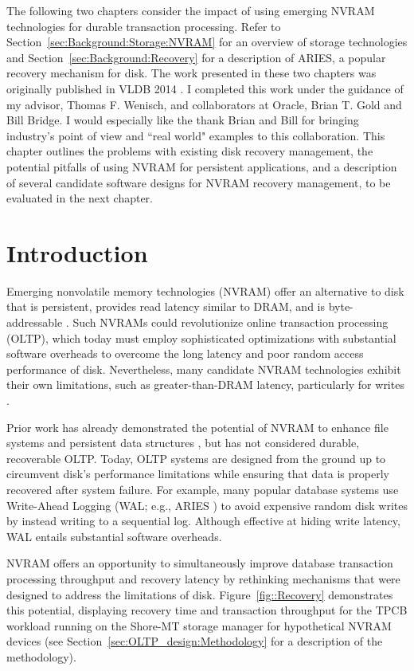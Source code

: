 The following two chapters consider the impact of using emerging NVRAM technologies for durable transaction processing.
Refer to Section~\ref{sec:Background:Storage:NVRAM} for an overview of storage technologies and Section~\ref{sec:Background:Recovery} for a description of ARIES, a popular recovery mechanism for disk.
The work presented in these two chapters was originally published in VLDB 2014 \cite{Pelley13}.
I completed this work under the guidance of my advisor, Thomas F. Wenisch, and collaborators at Oracle, Brian T. Gold and Bill Bridge.
I would especially like the thank Brian and Bill for bringing industry's point of view and ``real world" examples to this collaboration.
This chapter outlines the problems with existing disk recovery management, the potential pitfalls of using NVRAM for persistent applications, and a description of several candidate software designs for NVRAM recovery management, to be evaluated in the next chapter.

\section{Introduction}
\label{sec:OLTP_design:Intro}

Emerging nonvolatile memory technologies (NVRAM) offer an alternative to disk that is persistent, provides read latency similar to DRAM, and is byte-addressable \cite{BurrKurdi08}.
Such NVRAMs could revolutionize online transaction processing (OLTP), which today must employ sophisticated optimizations with substantial software overheads to overcome the long latency and poor random access performance of disk.
Nevertheless, many candidate NVRAM technologies exhibit their own limitations, such as greater-than-DRAM latency, particularly for writes \cite{LeeIpek09}.

Prior work has already demonstrated the potential of NVRAM to enhance file systems \cite{ConditNightingale09} and persistent data structures \cite{VenkataramanTolia11}, but has not considered durable, recoverable OLTP.
Today, OLTP systems are designed from the ground up to circumvent disk's performance limitations while ensuring that data is properly recovered after system failure.
For example, many popular database systems use Write-Ahead Logging (WAL; e.g., ARIES \cite{MohanHaderle92}) to avoid expensive random disk writes by instead writing to a sequential log.  
Although effective at hiding write latency, WAL entails substantial software overheads.

NVRAM offers an opportunity to simultaneously improve database transaction processing throughput and recovery latency by rethinking mechanisms that were designed to address the limitations of disk.
Figure~\ref{fig::Recovery} demonstrates this potential, displaying recovery time and transaction throughput for the TPCB workload running on the Shore-MT storage manager \cite{JohnsonPandis09} for hypothetical NVRAM devices (see Section~\ref{sec:OLTP_design:Methodology} for a description of the methodology).

